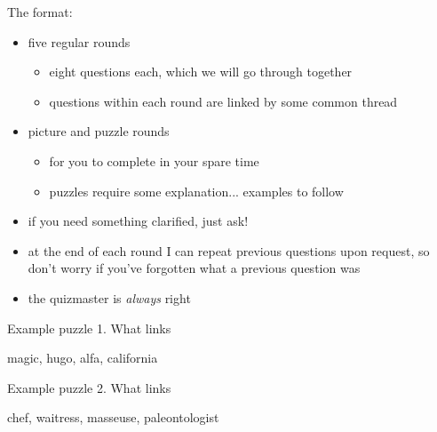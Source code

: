 \frame{\titlepage}

\begin{frame}
   The format:
   \begin{itemize}[<+(1)->]
      \item five regular rounds
      \begin{itemize}
         \item eight questions each, which we will go through together
         \item questions within each round are linked by some common thread
      \end{itemize}
      \item picture and puzzle rounds
      \begin{itemize}
         \item for you to complete in your spare time
         \item puzzles require some explanation... examples to follow
      \end{itemize}
   \end{itemize}

   \begin{itemize}[<+(1)->]
      \item if you need something clarified, just ask!
      \item at the end of each round I can repeat previous questions upon request, so don't worry if you've forgotten what a previous question was
      \item the quizmaster is \emph{always} right
   \end{itemize}
\end{frame}

\begin{frame}
    \large
    Example puzzle 1. What links
          \begin{center}
                  magic, hugo, alfa, california
          \end{center}
\end{frame}

\begin{frame}
   \large
   Example puzzle 2. What links
   \begin{center}
                  chef, waitress, masseuse, paleontologist
   \end{center}
\end{frame}
